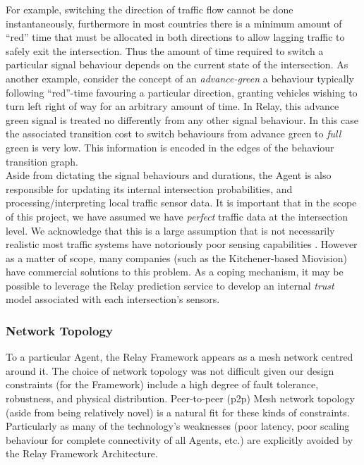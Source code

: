 \documentclass{report}
\begin{document}
For example, switching the direction of traffic flow cannot be done instantaneously, furthermore in most countries there is a minimum amount of ``red'' time that must be allocated in both directions to allow lagging traffic to safely exit the intersection.
Thus the amount of time required to switch a particular signal behaviour depends on the current state of the intersection.
As another example, consider the concept of an \emph{advance-green} a behaviour typically following ``red''-time favouring a particular direction, granting vehicles wishing to turn left right of way for an arbitrary amount of time.
In Relay, this advance green signal is treated no differently from any other signal behaviour.
In this case the associated transition cost to switch behaviours from advance green to \emph{full} green is very low.
This information is encoded in the edges of the behaviour transition graph. \\

Aside from dictating the signal behaviours and durations, the Agent is also responsible for updating its internal intersection probabilities, and processing/interpreting local traffic sensor data.
It is important that in the scope of this project, we have assumed we have \emph{perfect} traffic data at the intersection level.
We acknowledge that this is a large assumption that is not necessarily realistic most traffic systems have notoriously poor sensing capabilities \cite{Miovision:2012}.
However as a matter of scope, many companies (such as the Kitchener-based Miovision) have commercial solutions to this problem.
As a coping mechanism, it may be possible to leverage the Relay prediction service to develop an internal \emph{trust} model associated with each intersection's sensors.\\

\subsubsection{Network Topology}
\label{subsubsec:net-top}

To a particular Agent, the Relay Framework appears as a mesh network centred around it.
The choice of network topology was not difficult given our design constraints (for the Framework) include a high degree of fault tolerance, robustness, and physical distribution.
Peer-to-peer (p2p) Mesh network topology (aside from being relatively novel) is a natural fit for these kinds of constraints.
Particularly as many of the technology's weaknesses (poor latency, poor scaling behaviour for complete connectivity of all Agents, etc.) are explicitly avoided by the Relay Framework Architecture.\\
\end{document}
